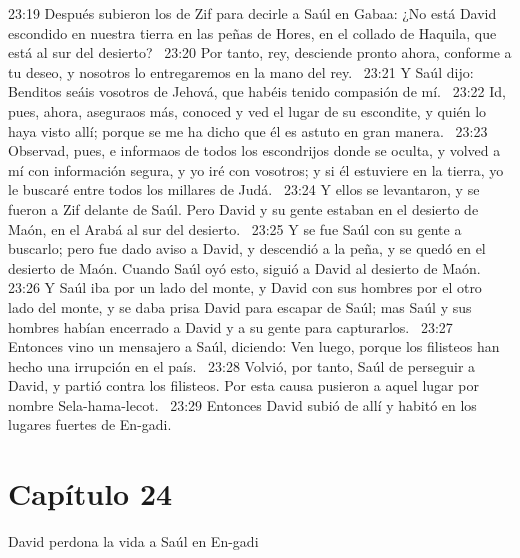 23:19 Después subieron los de Zif para decirle a Saúl en Gabaa: ¿No está David escondido en nuestra tierra en las peñas de Hores, en el collado de Haquila, que está al sur del desierto?  
23:20 Por tanto, rey, desciende pronto ahora, conforme a tu deseo, y nosotros lo entregaremos en la mano del rey.  
23:21 Y Saúl dijo: Benditos seáis vosotros de Jehová, que habéis tenido compasión de mí.  
23:22 Id, pues, ahora, aseguraos más, conoced y ved el lugar de su escondite, y quién lo haya visto allí; porque se me ha dicho que él es astuto en gran manera.  
23:23 Observad, pues, e informaos de todos los escondrijos donde se oculta, y volved a mí con información segura, y yo iré con vosotros; y si él estuviere en la tierra, yo le buscaré entre todos los millares de Judá.  
23:24 Y ellos se levantaron, y se fueron a Zif delante de Saúl. Pero David y su gente estaban en el desierto de Maón, en el Arabá al sur del desierto.  
23:25 Y se fue Saúl con su gente a buscarlo; pero fue dado aviso a David, y descendió a la peña, y se quedó en el desierto de Maón. Cuando Saúl oyó esto, siguió a David al desierto de Maón.  
23:26 Y Saúl iba por un lado del monte, y David con sus hombres por el otro lado del monte, y se daba prisa David para escapar de Saúl; mas Saúl y sus hombres habían encerrado a David y a su gente para capturarlos.  
23:27 Entonces vino un mensajero a Saúl, diciendo: Ven luego, porque los filisteos han hecho una irrupción en el país.  
23:28 Volvió, por tanto, Saúl de perseguir a David, y partió contra los filisteos. Por esta causa pusieron a aquel lugar por nombre Sela-hama-lecot.  
23:29 Entonces David subió de allí y habitó en los lugares fuertes de En-gadi.  
\section*{Capítulo 24}
David perdona la vida a Saúl en En-gadi  

